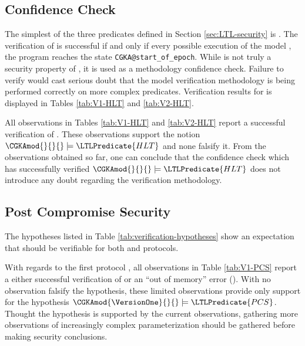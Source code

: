 \hypertarget{post-compromise-security}{%
\subsection{Confidence Check}\label{post-compromise-security}}

The simplest of the three  predicates defined in Section \ref{sec:LTL-security} is .
The verification of  is successful if and only if every possible execution of the model \CGKAmod{}{}{}, the program reaches the state \texttt{CGKA@start\_of\_epoch}.
While  is not truly a security property of \CGKAmod{}{}{}, it is used as a methodology confidence check.
Failure to verify  would cast serious doubt that the model verification methodology is being performed correctly on more complex  predicates.
Verification results for  is displayed in Tables \ref{tab:V1-HLT} and \ref{tab:V2-HLT}.

All observations in Tables \ref{tab:V1-HLT} and \ref{tab:V2-HLT} report a successful verification of .
These observations support the notion \( \CGKAmod{}{}{} \models \LTLPredicate{HLT} \) and none falsify it.
From the observations obtained so far, one can conclude that the confidence check which has successfully verified \( \CGKAmod{}{}{} \models \LTLPredicate{HLT} \) does not introduce any doubt regarding the verification methodology.


\hypertarget{post-compromise-security}{%
\subsection{Post Compromise Security}\label{post-compromise-security}}

The hypotheses listed in Table \ref{tab:verification-hypotheses} show an expectation that  should be verifiable for both \VersionOne and \VersionTwo protocols.

With regards to the first protocol \VersionOne, all observations in Table \ref{tab:V1-PCS} report a either successful verification of  or an ``out of memory'' error (\OutOfMemory).
With no observation falsify the hypothesis, these limited observations provide only support for the hypothesis \( \CGKAmod{\VersionOne}{}{} \models \LTLPredicate{PCS} \).
Thought the hypothesis is supported by the current observations, gathering more observations of increasingly complex \CGKAmod{\VersionOne}{}{} parameterization should be gathered before making security conclusions.

